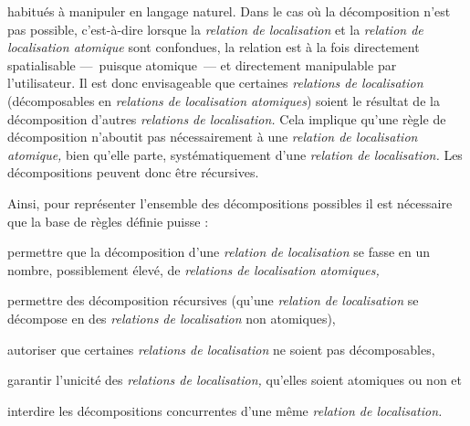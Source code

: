 habitués à manipuler en langage naturel. Dans le cas où la
décomposition n'est pas possible, c'est-à-dire lorsque la
\emph{relation de localisation} et la \emph{relation de localisation
  atomique} sont confondues, la relation est à la fois directement
spatialisable ---~puisque atomique~--- et directement manipulable par
l'utilisateur. Il est donc envisageable que certaines \emph{relations
  de localisation} (décomposables en \emph{relations de localisation
  atomiques}) soient le résultat de la décomposition d'autres
\emph{relations de localisation.} Cela implique qu'une règle de
décomposition n’aboutit pas nécessairement à une \emph{relation de
  localisation atomique,} bien qu'elle parte, systématiquement d'une
\emph{relation de localisation.} Les décompositions peuvent donc être
récursives.


Ainsi, pour représenter l'ensemble des décompositions possibles il est
nécessaire que la base de règles définie puisse :
\begin{enumerate*}[label=(\arabic*)]
\item permettre que la décomposition d'une \emph{relation de
    localisation} se fasse en un nombre, possiblement élevé, de
  \emph{relations de localisation atomiques,}
\item permettre des décomposition récursives (\ie qu'une
  \emph{relation de localisation} se décompose en des \emph{relations
    de localisation} non atomiques),
\item autoriser que certaines \emph{relations de localisation} ne soient pas
  décomposables,
\item garantir l'unicité des \emph{relations de localisation,}
  qu'elles soient atomiques ou non et
\item interdire les décompositions concurrentes d'une même
  \emph{relation de localisation.}
\end{enumerate*}


